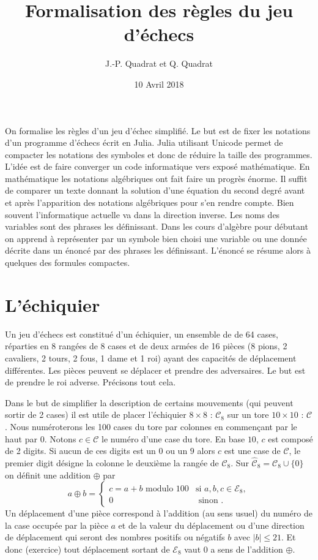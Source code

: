 \documentclass[11pt]{article}
\newcommand{\EE}{{\mathcal{E}}}
\newcommand{\CC}{{\mathcal{C}}}
\begin{document}
\title{Formalisation des règles du jeu d'échecs}
\author{J.-P. Quadrat et Q. Quadrat}
\date{10 Avril 2018}
\maketitle

On formalise les règles d'un jeu d'échec simplifié. Le but est de fixer les notations d'un programme
d'échecs écrit en Julia. Julia utilisant Unicode permet de  compacter les notations des symboles
et donc de réduire la taille des programmes. L'idée est de faire converger un code informatique
vers exposé mathématique. En mathématique les notations algébriques ont fait faire un progrès énorme.
Il suffit de comparer un texte donnant la solution d'une équation du second degré avant et après l'apparition
des notations algébriques pour s'en rendre compte. Bien souvent l'informatique actuelle va dans la direction
inverse. Les noms des variables sont des phrases les définissant. Dans les cours d'algèbre pour débutant
on apprend à représenter par un symbole bien choisi une variable ou une donnée décrite dans un énoncé
par des phrases les définissant. L'énoncé se résume alors à quelques des formules compactes.

\section{L'échiquier}

\newgame
\begin{center}\showboard\end{center}

Un jeu d'échecs est constitué d'un échiquier, un ensemble de de 64 cases, réparties en  8 rangées de 8 cases et de deux armées
de 16 pièces (8 pions, 2 cavaliers, 2 tours, 2 fous, 1 dame et 1 roi) ayant des capacités de déplacement différentes. Les
pièces peuvent se déplacer et prendre des adversaires. Le but est de prendre le roi adverse.  Précisons tout cela.

Dans le but de simplifier la description de certains mouvements (qui peuvent sortir de 2 cases)  il est utile de placer l'échiquier
$8 \times 8$ : $\CC_8$ sur un tore  $10 \times 10 $ : $\CC$. Nous numéroterons les 100 cases du tore par colonnes en commençant par le haut
par $0$. Notons $c\in \CC$ le numéro d'une case du tore. En base $10$, $c$ est composé de 2 digits. Si aucun de ces digits est un $0$ ou un $9$ alors $c$ est une case de $\CC$, le premier digit  désigne la colonne le deuxième la rangée de $\CC_8$. Sur $\hat{\CC}_8=\CC_8\cup \{0\}$ on définit une addition $\oplus$ par
$$a\oplus b=\left\{
\begin{array}{cl}
 c=a+b \mbox{ modulo } 100 & \mbox{si } a,b,c\in\EE_8 ,\\
                       0   &  \mbox{ sinon .}
 \end{array}  \right .  $$
Un déplacement d'une pièce correspond à l'addition (au sens usuel) du numéro de la case occupée par la pièce $a$ et de la valeur du déplacement ou d'une direction de déplacement qui seront des nombres positifs ou négatifs $b$ avec $ | b |\leq 21$. Et donc (exercice) tout déplacement sortant de $\EE_8$ vaut $0$ a sens de l'addition $\oplus$.
\end{document}
